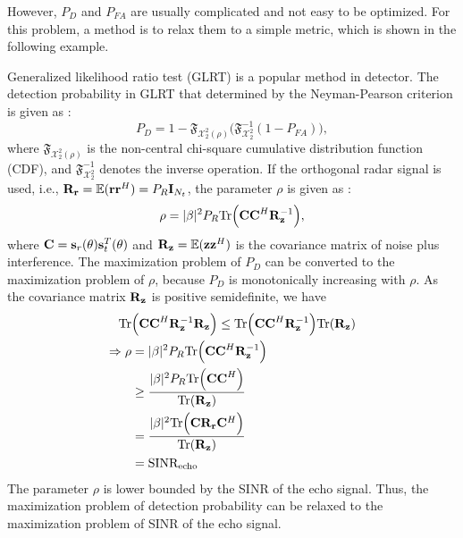 However, $P_D$ and $P_{FA}$ are usually complicated and not easy to be optimized. For this problem, a method is to relax 
them to a simple metric, which is shown in the following example.

Generalized likelihood ratio test (GLRT) is a popular method in detector. The detection probability in GLRT that determined by the 
Neyman-Pearson criterion is given as \cite{wang2020ris}:
\begin{equation}
    P_D = 1 - \mathfrak{F}_{\mathcal{X}_2^2(\rho)}\Big(\mathfrak{F}_{\mathcal{X}_2^2}^{-1}(1-P_{FA})\Big),
\end{equation}
where $\mathfrak{F}_{\mathcal{X}_2^2(\rho)}$ is the non-central chi-square cumulative distribution function (CDF), and 
$\mathfrak{F}_{\mathcal{X}_2^2}^{-1}$ denotes the inverse operation. If the orthogonal radar signal is used, i.e., ${\bf R_r} = \mathbb{E}({\bf rr}^H) = P_R {\bf I}_{N_t}$,
the parameter $\rho$ is given as \cite{wang2020ris}:
\begin{equation}
    \rho = |\beta|^2 P_R {\rm Tr}\Big( {\bf CC}^H {\bf R}_{\bf z}^{-1} \Big),
\end{equation}
where ${\bf C} = {\bf s}_r(\theta) {\bf s}_t^T(\theta)$ and ${\bf R}_{\bf z} = \mathbb{E}({\bf zz}^H)$ is the covariance matrix of noise plus interference. The maximization problem of $P_D$ can be converted to 
the maximization problem of $\rho$, because $P_D$ is monotonically increasing with $\rho$. As the covariance matrix ${\bf R}_{\bf z}$
is positive semidefinite, we have
\begin{align}
    {\rm Tr}&\Big( {\bf CC}^H {\bf R}_{\bf z}^{-1}{\bf R}_{\bf z} \Big) \leq {\rm Tr} \Big( {\bf CC}^H {\bf R}_{\bf z}^{-1} \Big) {\rm Tr}({\bf R}_{\bf z})\\
    \Rightarrow \rho &= |\beta|^2 P_R {\rm Tr} \Big( {\bf CC}^H {\bf R}_{\bf z}^{-1} \Big) \nonumber\\
    &\geq \frac{|\beta|^2 P_R{\rm Tr}\Big( {\bf CC}^H \Big)}{{\rm Tr}({\bf R}_{\bf z})}  \nonumber\\
    &= \frac{|\beta|^2 {\rm Tr}\Big( {\bf C}{\bf R_r} {\bf C}^H \Big)}{{\rm Tr}({\bf R}_{\bf z})} \nonumber \\
    &= \text{SINR}_{\text{echo}}
\end{align}
The parameter $\rho$ is lower bounded by the SINR of the echo signal. Thus, the maximization problem of detection probability
can be relaxed to the maximization problem of SINR of the echo signal.


